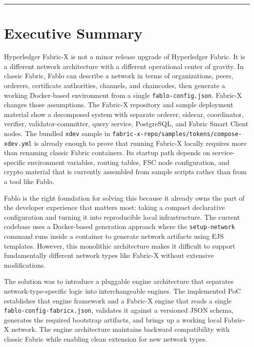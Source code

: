 \vspace{0.2cm}
\begin{center}
    \textcolor{secondary}{\rule{0.5\textwidth}{0.3pt}}
\end{center}
\vspace{0.3cm}

\tableofcontents

\newpage
\section{Executive Summary}

Hyperledger Fabric-X is not a minor release upgrade of Hyperledger Fabric. It is a different network architecture with a different operational center of gravity. In classic Fabric, Fablo can describe a network in terms of organizations, peers, orderers, certificate authorities, channels, and chaincodes, then generate a working Docker-based environment from a single \texttt{fablo-config.json}. Fabric-X changes those assumptions. The Fabric-X repository and sample deployment material show a decomposed system with separate orderer, sidecar, coordinator, verifier, validator-committer, query service, PostgreSQL, and Fabric Smart Client nodes. The bundled \texttt{xdev} sample in \texttt{fabric-x-repo/samples/tokens/compose-xdev.yml} is already enough to prove that running Fabric-X locally requires more than renaming classic Fabric containers. Its startup path depends on service-specific environment variables, routing tables, FSC node configuration, and crypto material that is currently assembled from sample scripts rather than from a tool like Fablo.

Fablo is the right foundation for solving this because it already owns the part of the developer experience that matters most: taking a compact declarative configuration and turning it into reproducible local infrastructure. The current codebase uses a Docker-based generation approach where the \texttt{setup-network} command runs inside a container to generate network artifacts using EJS templates. However, this monolithic architecture makes it difficult to support fundamentally different network types like Fabric-X without extensive modifications.

The solution was to introduce a pluggable engine architecture that separates network-type-specific logic into interchangeable engines. The implemented PoC establishes that engine framework and a Fabric-X engine that reads a single \texttt{fablo-config-fabricx.json}, validates it against a versioned JSON schema, generates the required bootstrap artifacts, and brings up a working local Fabric-X network. The engine architecture maintains backward compatibility with classic Fabric while enabling clean extension for new network types.

